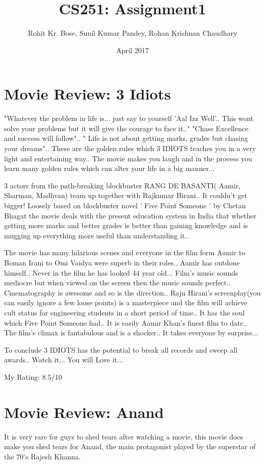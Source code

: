 \documentclass{article}
\title{CS251: Assignment1}
\author{Rohit Kr. Bose, Sunil Kumar Pandey, Rohan Krishnan Chaudhary }
\date{April 2017}
\begin{document}
\maketitle

\section{Movie Review: 3 Idiots}
"Whatever the problem in life is... just say to yourself 'Aal Izz Well'.. This wont solve your problems but it will give the courage to face it.." "Chase Excellence and success will follow".. " Life is not about getting marks, grades but chasing your dreams".. These are the golden rules which 3 IDIOTS teaches you in a very light and entertaining way.. The movie makes you laugh and in the process you learn many golden rules which can alter your life in a big manner...

3 actors from the path-breaking blockbuster RANG DE BASANTI( Aamir, Sharman, Madhvan) team up together with Rajkumar Hirani.. It couldn't get bigger! Loosely based on blockbuster novel ' Five Point Someone ' by Chetan Bhagat the movie deals with the present education system in India that whether getting more marks and better grades is better than gaining knowledge and is mugging up everything more useful than understanding it..

The movie has many hilarious scenes and everyone in the film form Aamir to Boman Irani to Omi Vaidya were superb in their roles.. Aamir has outdone himself.. Never in the film he has looked 44 year old... Film's music sounds mediocre but when viewed on the screen then the music sounds perfect.. Cinematography is awesome and so is the direction.. Raju Hirani's screenplay(you can easily ignore a few loose points) is a masterpiece and the film will achieve cult status for engineering students in a short period of time.. It has the soul which Five Point Someone had.. It is easily Aamir Khan's finest film to date.. The film's climax is fantabulous and is a shocker.. It takes everyone by surprise...

To conclude 3 IDIOTS has the potential to break all records and sweep all awards.. Watch it... You will Love it...

My Rating: 8.5/10
\section{Movie Review: Anand}
It is very rare for guys to shed tears after watching a movie, this movie does make you shed tears for Anand, the main protagonist played by the superstar of the 70's Rajesh Khanna.
\end{document}
